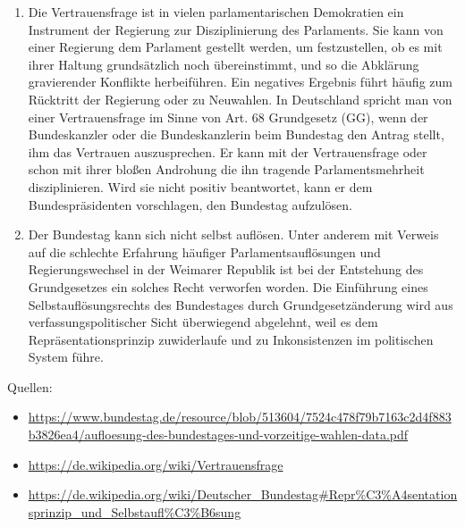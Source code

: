 \documentclass{article}
\begin{document}
\begin{enumerate}[label=(\alph*)]
\begin{itemize}
		\end{itemize}
		\item Die Vertrauensfrage ist in vielen parlamentarischen Demokratien ein Instrument der Regierung zur Disziplinierung des Parlaments. Sie kann von einer Regierung dem Parlament gestellt werden, um festzustellen, ob es mit ihrer Haltung grundsätzlich noch übereinstimmt, und so die Abklärung gravierender Konflikte herbeiführen. Ein negatives Ergebnis führt häufig zum Rücktritt der Regierung oder zu Neuwahlen. In Deutschland spricht man von einer Vertrauensfrage im Sinne von Art. 68 Grundgesetz (GG), wenn der Bundeskanzler oder die Bundeskanzlerin beim Bundestag den Antrag stellt, ihm das Vertrauen auszusprechen. Er kann mit der Vertrauensfrage oder schon mit ihrer bloßen Androhung die ihn tragende Parlamentsmehrheit disziplinieren. Wird sie nicht positiv beantwortet, kann er dem Bundespräsidenten vorschlagen, den Bundestag aufzulösen.
		\item Der Bundestag kann sich nicht selbst auflösen. Unter anderem mit Verweis auf die schlechte Erfahrung häufiger Parlamentsauflösungen und Regierungswechsel in der Weimarer Republik ist bei der Entstehung des Grundgesetzes ein solches Recht verworfen worden. Die Einführung eines Selbstauflösungsrechts des Bundestages durch Grundgesetzänderung wird aus verfassungspolitischer Sicht überwiegend abgelehnt, weil es dem Repräsentationsprinzip zuwiderlaufe und zu Inkonsistenzen im politischen System führe.
	\end{enumerate}

	Quellen:
	\begin{itemize}
		\item \url{https://www.bundestag.de/resource/blob/513604/7524c478f79b7163c2d4f883b3826ea4/aufloesung-des-bundestages-und-vorzeitige-wahlen-data.pdf}
		\item \url{https://de.wikipedia.org/wiki/Vertrauensfrage}
		\item \url{https://de.wikipedia.org/wiki/Deutscher_Bundestag#Repr%C3%A4sentationsprinzip_und_Selbstaufl%C3%B6sung}
	\end{itemize}
\end{document}
